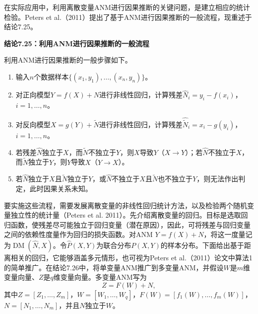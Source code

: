\begin{figure}[htbp]
\centering

\end{figure}

在实际应用中，利用离散变量ANM进行因果推断的关键问题，是建立相应的统计检验。Peters et al.（2011）提出了基于ANM进行因果推断的一般流程，现重述于结论7.25。

\par\medskip{}\noindent\textbf{结论7.25：利用ANM进行因果推断的一般流程}\par
利用ANM进行因果推断的一般步骤如下。
\begin{enumerate}[label=\textbf{步骤\arabic*.},leftmargin=4.8em]
\item 输入$n$个数据样本$\{(x_1,y_1),\ldots,(x_n,y_n)\}$。
\item 对正向模型$Y=f(X)+N$进行非线性回归，计算残差$\widehat N_i=y_i-f(x_i)$，$i=1,\ldots,n$。
\item 对反向模型$X=g(Y)+\widetilde N$进行非线性回归，计算残差$\widehat{\widetilde N}_i=x_i-g(y_i)$，$i=1,\ldots,n$。
\item 若残差$\widehat N$独立于$X$，而$\widetilde N$不独立于$Y$，则$X$导致$Y$（$X\to Y$）；若$\widehat N$不独立于$X$，而$\widetilde N$独立于$Y$，则$Y$导致$X$（$Y\to X$）。
\item 若$\widehat N$独立于$X$且$\widetilde N$独立于$Y$，或$\widehat N$不独立于$X$且$\widetilde N$也不独立于$Y$，则无法作出判定，此时因果关系未知。
\end{enumerate}

要实施这些流程，需要发展离散变量的非线性回归统计方法，以及检验两个随机变量独立性的统计量（Peters et al. 2011）。先介绍离散变量的回归。目标是选取回归函数，使残差尽可能独立于回归变量（潜在原因），因此，可将残差与回归变量之间的依赖性度量作为回归的损失函数。对ANM $Y=f(X)+N$，将这一度量记为$\operatorname{DM}(\widehat N,X)$。令$\widehat P(X,Y)$为联合分布$P(X,Y)$的样本分布。下面给出基于距离相关的回归，它能够涵盖多元情形，也可视为Peters et al.（2011）论文中算法1的简单推广。在结论7.26中，将单变量ANM推广到多变量ANM，并假设$W$是$m$维变量向量、$Z$是$q$维变量向量。多变量ANM写为
\[
Z=F(W)+N,
\]
其中$Z=[Z_1,\ldots,Z_m]$，$W=[W_1,\ldots,W_q]$，$F(W)=[f_1(W),\ldots,f_m(W)]$，$N=[N_1,\ldots,N_m]$，并且$N$独立于$W$。

